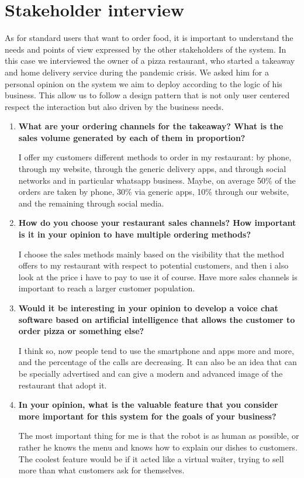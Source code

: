 \section{Stakeholder interview}

As for standard users that want to order food, it is important to understand the needs and points of view expressed by the other stakeholders of the system. In this case we interviewed the owner of a pizza restaurant, who started a takeaway and home delivery service during the pandemic crisis. 
We asked him for a personal opinion on the system we aim to deploy according to the logic of his business. This allow us to follow a design pattern that is not only user centered respect the interaction but also driven by the business needs.


\begin{enumerate}

\item \textbf{What are your ordering channels for the takeaway?
What is the sales volume generated by each of them in proportion?}

I offer my customers different methods to order in my restaurant: by phone, through my website, through the generic delivery apps, and through social networks and in particular whatsapp business. Maybe, on average 50\% of the orders are taken by phone, 30\% via generic apps, 10\% through our website, and the remaining through social media.

\item \textbf{How do you choose your restaurant sales channels? How important is it in your opinion to have multiple ordering methods?}

I choose the sales methods mainly based on the visibility that the method offers to my restaurant with respect to potential customers, and then i also look at the price i have to pay to use it of course. Have more sales channels is important to reach a larger customer population.

\item \textbf{Would it be interesting in your opinion to develop a voice chat software based on artificial intelligence that allows the customer to order pizza or something else?}

I think so, now people tend to use the smartphone and apps more and more, and the percentage of the calls are decreasing. It can also be an idea that can be specially advertised and can give a modern and advanced image of the restaurant that adopt it.  

\item \textbf{In your opinion, what is the valuable feature that you consider more important for this system for the goals of your business?}

The most important thing for me is that the robot is as human as possible, or rather he knows the menu and knows how to explain our dishes to customers. The coolest feature would be if it acted like a virtual waiter, trying to sell more than what customers ask for themselves. 



\end{enumerate} 
